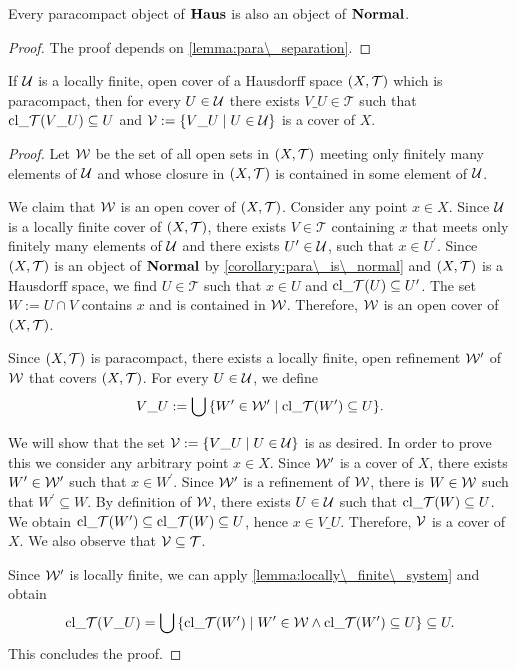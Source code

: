 \begin{corollary} \label{corollary:para\_is\_normal} \cite[p. 72]{Top}
	Every paracompact object of $\Haus$ is also an object of $\Normal$. 
\end{corollary}
\begin{proof}
	The proof depends on \ref{lemma:para\_separation}.
\end{proof}

\begin{lemma} \label{lemma:special\_cover}
	If $\cover$ is a locally finite, open cover of a Hausdorff space $\tspace$ which is paracompact, then for every $U \in \cover$ there exists $V\_U \in \mathcal{T}$ such that $\cl{V\_U} \subseteq U$ and $\cover[V] := \Bbraces{V\_U \mid U \in \cover}$ is a cover of $X$.  
\end{lemma}
\begin{proof}
	Let $\cover[W]$ be the set of all open sets in $\tspace$ meeting only finitely many elements of $\cover$ and whose closure in $\tspace$ is contained in some element of $\cover$.
	
	We claim that $\cover[W]$ is an open cover of $\tspace$. Consider any point $x \in X$. Since $\cover$ is a locally finite cover of $\tspace$, there exists $V \in \mathcal{T}$ containing $x$ that meets only finitely many elements of $\cover$ and there exists $U^\prime \in \cover$, such that $x \in U^\prime$. Since $\tspace$ is an object of $\Normal$ by \ref{corollary:para\_is\_normal} and $\tspace$ is a Hausdorff space, we find $U \in \mathcal{T}$ such that $x \in U$ and $\cl{U} \subseteq U^\prime$. The set $W := U \cap V$ contains $x$ and is contained in $\cover[W]$. Therefore, $\cover[W]$ is an open cover of $\tspace$. 
	
	Since $\tspace$ is paracompact, there exists a locally finite, open refinement $\cover[W]^\prime$ of $\cover[W]$ that covers $\tspace$. For every $U \in \cover$, we define
	\begin{align*}
		V\_U := \bigcup \Bbraces{W^\prime \in \cover[W]^\prime \mid \cl{W^\prime} \subseteq U}.
	\end{align*}
	
	We will show that the set $\cover[V] := \Bbraces{V\_U \mid U \in \cover}$ is as desired. In order to prove this we consider any arbitrary point $x \in X$. Since $\cover[W]^\prime$ is a cover of $X$, there exists $W^\prime \in \cover[W]^\prime$ such that $x \in W^\prime$. Since $\cover[W]^\prime$ is a refinement of $\cover[W]$, there is $W \in \cover[W]$ such that $W^\prime \subseteq W$. By definition of $\cover[W]$, there exists $U \in \cover$ such that $\cl{W} \subseteq U$. We obtain $\cl{W^\prime} \subseteq \cl{W} \subseteq U$, hence $x \in V\_U$. Therefore, $\cover[V]$ is a cover of $X$. We also observe that $\cover[V] \subseteq \mathcal{T}$. 
	
	Since $\cover[W]^\prime$ is locally finite, we can apply \ref{lemma:locally\_finite\_system} and obtain
	\begin{align*}
		\cl{V\_U} = \bigcup \Bbraces{\cl{W^\prime} \mid W^\prime \in \cover[W] \land \cl{W^\prime} \subseteq U} \subseteq U.
	\end{align*}
	This concludes the proof.
\end{proof}

